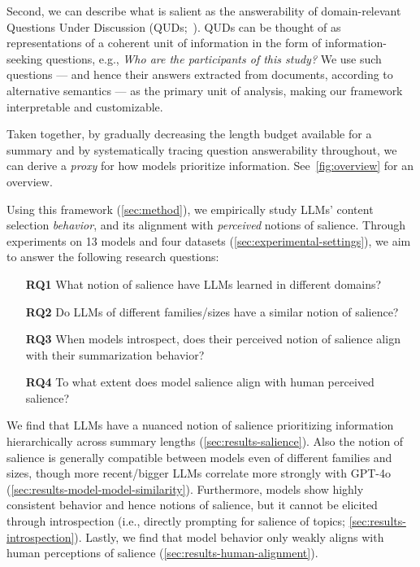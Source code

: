 Second, we can describe what is salient as the answerability of domain-relevant Questions Under Discussion (QUDs;~\citealp{Van:1995:discourse,Benz:2017:questions,Wu:2023:EMNLP}). QUDs can be thought of as representations of a coherent unit of information in the form of information-seeking questions, e.g., \emph{Who are the participants of this study?}
We use such questions --- and hence their answers extracted from documents, according to alternative semantics \cite{Hamblin:1973:Questions,Karttunen:1977:syntax,Groenendijk:1984:studies} --- as the primary unit of analysis, making our framework interpretable and customizable.

Taken together, by gradually decreasing the length budget available for a summary and by systematically tracing question answerability throughout, we can derive a \emph{proxy} for how models prioritize information.
See~\cref{fig:overview} for an overview.

Using this framework (\cref{sec:method}), we empirically study LLMs' content selection \emph{behavior}, and its alignment with \emph{perceived} notions of salience. Through experiments on 13 models and four datasets (\cref{sec:experimental-settings}), we aim to answer the following research questions:
%
\begin{itemize}[noitemsep,leftmargin=27pt]
    \item[\textbf{RQ1}] What notion of salience have LLMs learned in different domains?
    \item[\textbf{RQ2}] Do LLMs of different families/sizes have a similar notion of salience?
    \item[\textbf{RQ3}] When models introspect, does their perceived notion of salience align with their summarization behavior?
    \item[\textbf{RQ4}] To what extent does model salience align with human perceived salience?
\end{itemize}
%
We find that LLMs have a nuanced notion of salience prioritizing information hierarchically across summary lengths (\cref{sec:results-salience}).
Also the notion of salience is generally compatible between models even of different families and sizes, though more recent/bigger LLMs correlate more strongly with GPT-4o (\cref{sec:results-model-model-similarity}).
Furthermore, models show highly consistent behavior and hence notions of salience, but it cannot be elicited through introspection (i.e., directly prompting for salience of topics; \cref{sec:results-introspection}). Lastly, we find that model behavior only weakly aligns with human perceptions of salience (\cref{sec:results-human-alignment}).

